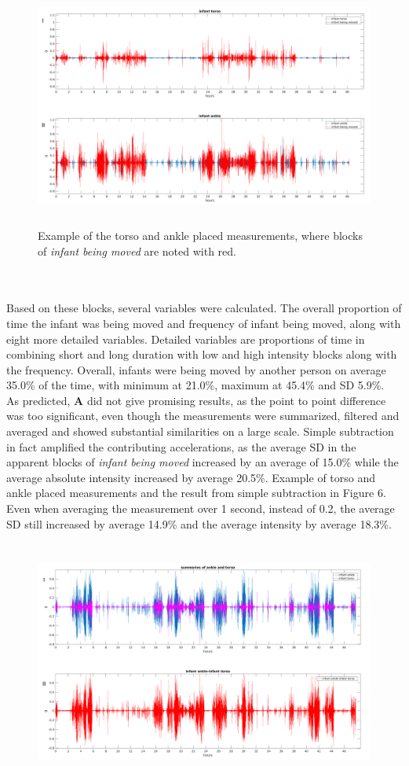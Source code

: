 \documentclass{article}
\begin{document}
{\begin{figure}[h]
\includegraphics[width=15cm, height=8cm]{final_plotE.png}
\caption{Example of the torso and ankle placed measurements, where blocks of \textit{infant being moved} are noted with red.}
\end{figure}
\\\\Based on these blocks, several variables were calculated. The overall proportion of time the infant was being moved and frequency of infant being moved, along with eight more detailed variables. Detailed variables are proportions of time in combining short and long duration with low and high intensity blocks along with the frequency. Overall, infants were being moved by another person on average 35.0\% of the time, with minimum at 21.0\%, maximum at 45.4\% and SD 5.9\%. 
\\As predicted, \textbf{A} did not give promising results, as the point to point difference was too significant, even though the measurements were summarized, filtered and averaged and showed substantial similarities on a large scale. Simple subtraction in fact amplified the contributing accelerations, as the average SD in the apparent blocks of \textit{infant being moved} increased by an average of 15.0\% while the average absolute intensity increased by average 20.5\%. Example of torso and ankle placed measurements and the result from simple subtraction in Figure 6. Even when averaging the measurement over 1 second, instead of 0.2, the average SD still increased by average 14.9\% and the average intensity by average 18.3\%.
\begin{figure}[h]
\includegraphics[width=15cm, height=8cm]{SimpleSubtracting.png}

\end{figure}}
\end{document}
